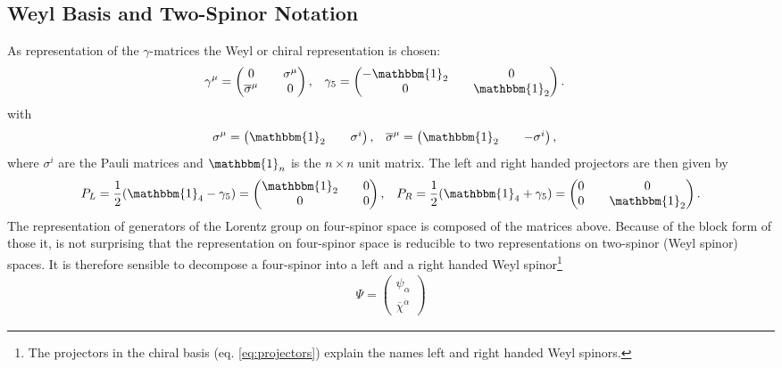 \subsection{Weyl Basis and Two-Spinor Notation}\label{sec:2spinor_notation}
As representation of the $\gamma$-matrices the Weyl or chiral representation is chosen:
\begin{align}
&\gamma^\mu = \begin{pmatrix}
0 && \sigma^\mu\\
\overline{\sigma}^\mu && 0
\end{pmatrix}, &&
\gamma_5 = \begin{pmatrix}
-\mathbbm{1}_2 && 0\\
0 && \mathbbm{1}_2
\end{pmatrix}.
\end{align}
with
\begin{align}
&\sigma^\mu = \begin{pmatrix}
\mathbbm{1}_2 && \sigma^i
\end{pmatrix}, &&
\overline{\sigma}^\mu = \begin{pmatrix}
\mathbbm{1}_2 && -\sigma^i
\end{pmatrix},\label{eq:Pauli}
\end{align}
where $\sigma^i$ are the Pauli matrices and $\mathbbm{1}_n$ is the $n \times n$ unit matrix. The left and right handed projectors are then given by
\begin{align}
P_L = \frac{1}{2}(\mathbbm{1}_4 - \gamma_5) = \begin{pmatrix}
\mathbbm{1}_2 && 0\\
0 && 0
\end{pmatrix}, && 
P_R = \frac{1}{2}(\mathbbm{1}_4 + \gamma_5) = \begin{pmatrix}
0 && 0\\
0 && \mathbbm{1}_2
\end{pmatrix}.\label{eq:projectors}
\end{align}
The representation of generators of the Lorentz group on four-spinor space is composed of the matrices above. Because of the block form of those it, is not surprising that the representation on four-spinor space is reducible to two representations on two-spinor (Weyl spinor) spaces. It is therefore sensible to decompose a four-spinor into a left and a right handed Weyl spinor\footnote{The projectors in the chiral basis (eq. \eqref{eq:projectors}) explain the names left and right handed Weyl spinors.}
\begin{align}
\Psi = \begin{pmatrix}
\psi_\alpha \\
\overline{\chi}^{\dot{\alpha}}
\end{pmatrix}
\end{align}
